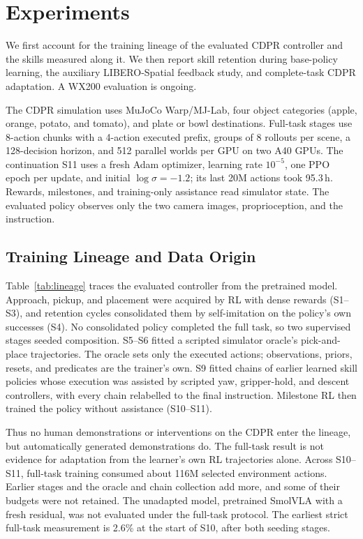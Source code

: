 \section{Experiments}\label{sec:experiments}
We first account for the training lineage of the evaluated CDPR controller and the skills measured along it. We then report skill retention during base-policy learning, the auxiliary LIBERO-Spatial feedback study, and complete-task CDPR adaptation. A WX200 evaluation is ongoing.

The CDPR simulation uses MuJoCo Warp/MJ-Lab, four object categories (apple, orange, potato, and tomato), and plate or bowl destinations. Full-task stages use 8-action chunks with a 4-action executed prefix, groups of 8 rollouts per scene, a 128-decision horizon, and 512 parallel worlds per GPU on two A40 GPUs. The continuation S11 uses a fresh Adam optimizer, learning rate $10^{-5}$, one PPO epoch per update, and initial $\log\sigma=-1.2$; its last 20M actions took 95.3\,h. Rewards, milestones, and training-only assistance read simulator state. The evaluated policy observes only the two camera images, proprioception, and the instruction.


\subsection{Training Lineage and Data Origin}\label{sec:lineage}
Table~\ref{tab:lineage} traces the evaluated controller from the pretrained model. Approach, pickup, and placement were acquired by RL with dense rewards (S1--S3), and retention cycles consolidated them by self-imitation on the policy's own successes (S4). No consolidated policy completed the full task, so two supervised stages seeded composition. S5--S6 fitted a scripted simulator oracle's pick-and-place trajectories. The oracle sets only the executed actions; observations, priors, resets, and predicates are the trainer's own. S9 fitted chains of earlier learned skill policies whose execution was assisted by scripted yaw, gripper-hold, and descent controllers, with every chain relabelled to the final instruction. Milestone RL then trained the policy without assistance (S10--S11).

Thus no human demonstrations or interventions on the CDPR enter the lineage, but automatically generated demonstrations do. The full-task result is not evidence for adaptation from the learner's own RL trajectories alone. Across S10--S11, full-task training consumed about 116M selected environment actions. Earlier stages and the oracle and chain collection add more, and some of their budgets were not retained. The unadapted model, pretrained SmolVLA with a fresh residual, was not evaluated under the full-task protocol. The earliest strict full-task measurement is 2.6\% at the start of S10, after both seeding stages.



